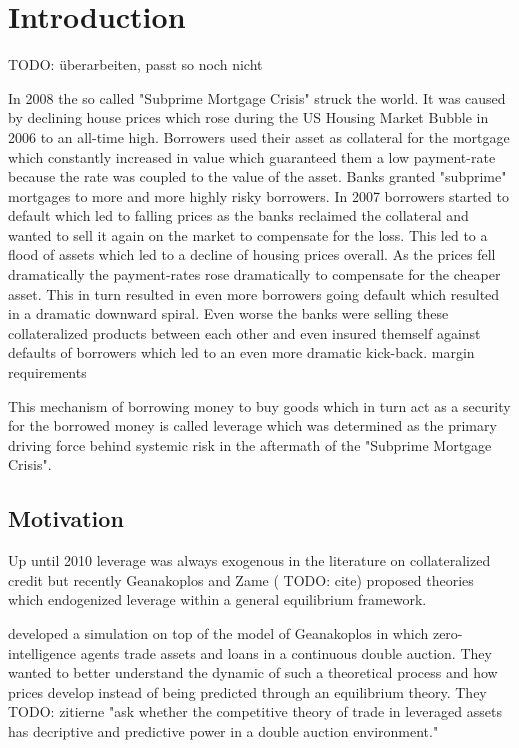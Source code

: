 \documentclass[Bachelorarbeit.tex]{subfiles}
\begin{document}
\chapter{Introduction}

TODO: überarbeiten, passt so noch nicht

In 2008 the so called "Subprime Mortgage Crisis" struck the world. It was caused by declining house prices which rose during the US Housing Market Bubble in 2006 to an all-time high. Borrowers used their asset as collateral for the mortgage which constantly increased in value which guaranteed them a low payment-rate because the rate was coupled to the value of the asset.
Banks granted "subprime" mortgages to more and more highly risky borrowers. In 2007 borrowers started to default which led to falling prices as the banks reclaimed the collateral and wanted to sell it again on the market to compensate for the loss. This led to a flood of assets which led to a decline of housing prices overall.
As the prices fell dramatically the payment-rates rose dramatically to compensate for the cheaper asset. This in turn resulted in even more borrowers going default which resulted in a dramatic downward spiral.
Even worse the banks were selling these collateralized products between each other and even insured themself against defaults of borrowers which led to an even more dramatic kick-back.
margin requirements

\thinspace

This mechanism of borrowing money to buy goods which in turn act as a security for the borrowed money is called leverage which was determined as the primary driving force behind systemic risk in the aftermath of the "Subprime Mortgage Crisis".

\section{Motivation}
Up until 2010 leverage was always exogenous in the literature on collateralized credit but recently Geanakoplos and Zame ( TODO: cite) proposed theories which endogenized leverage within a general equilibrium framework.

\thinspace

\cite{Breuer2015} developed a simulation on top of the model of Geanakoplos in which zero-intelligence agents trade assets and loans in a continuous double auction. They wanted to better understand the dynamic of such a theoretical process and how prices develop instead of being predicted through an equilibrium theory. They TODO: zitierne "ask whether the competitive theory of trade in leveraged assets has decriptive and predictive power in a double auction environment."
\end{document}
